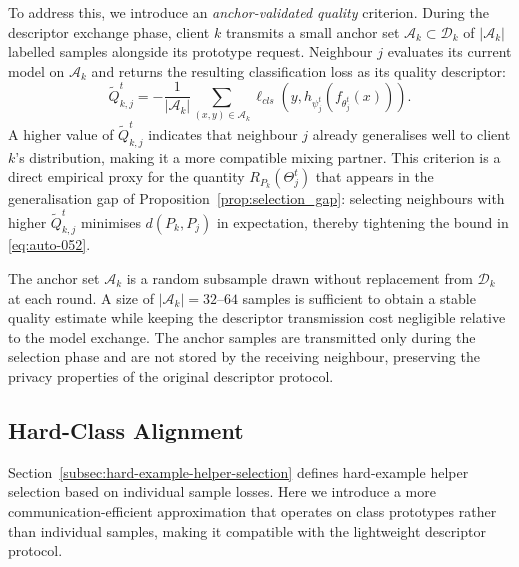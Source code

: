 \documentclass[conference]{IEEEtran}
\begin{document}
To address this, we introduce an \emph{anchor-validated quality} criterion. During the descriptor exchange phase, client \(k\) transmits a small anchor set \(\mathcal{A}_k \subset \mathcal{D}_k\) of \(|\mathcal{A}_k|\) labelled samples alongside its prototype request. Neighbour \(j\) evaluates its current model on \(\mathcal{A}_k\) and returns the resulting classification loss as its quality descriptor:
\begin{equation}
    \tilde{Q}_{k,j}^{t}
    =
    -\frac{1}{|\mathcal{A}_k|}
    \sum_{(x,y)\in\mathcal{A}_k}
    \ell_{cls}(y, h_{\psi_j^t}(f_{\theta_j^t}(x))).
    \label{eq:anchor_quality}
\end{equation}
A higher value of \(\tilde{Q}_{k,j}^t\) indicates that neighbour \(j\) already generalises well to client \(k\)'s distribution, making it a more compatible mixing partner. This criterion is a direct empirical proxy for the quantity \(R_{P_k}(\Theta_j^t)\) that appears in the generalisation gap of Proposition~\ref{prop:selection_gap}: selecting neighbours with higher \(\tilde{Q}_{k,j}^t\) minimises \(d(P_k, P_j)\) in expectation, thereby tightening the bound in \eqref{eq:auto-052}.

The anchor set \(\mathcal{A}_k\) is a random subsample drawn without replacement from \(\mathcal{D}_k\) at each round. A size of \(|\mathcal{A}_k| = 32\)--\(64\) samples is sufficient to obtain a stable quality estimate while keeping the descriptor transmission cost negligible relative to the model exchange. The anchor samples are transmitted only during the selection phase and are not stored by the receiving neighbour, preserving the privacy properties of the original descriptor protocol.

\subsection{Hard-Class Alignment}
\label{subsec:hard-class-alignment}
Section~\ref{subsec:hard-example-helper-selection} defines hard-example helper selection based on individual sample losses. Here we introduce a more communication-efficient approximation that operates on class prototypes rather than individual samples, making it compatible with the lightweight descriptor protocol.
\end{document}
